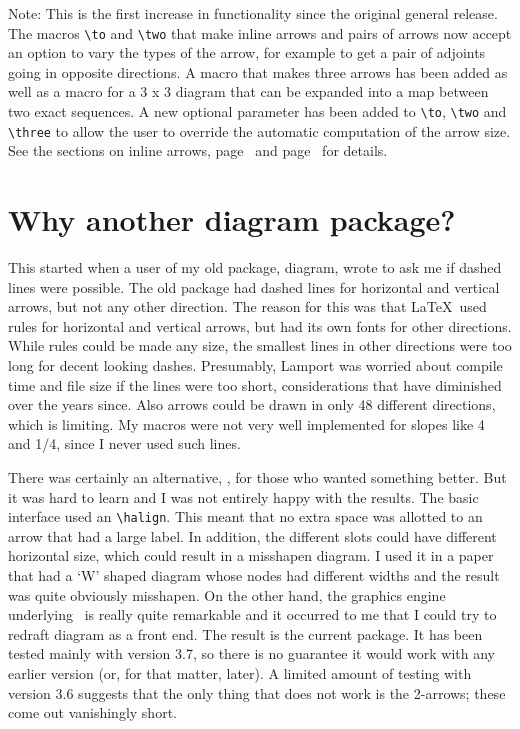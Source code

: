 \documentclass[12pt]{article}
\begin{document}
\kern 5pt
 Note:  This is the first increase in functionality since the original
general release.  The macros \verb.\to. and
\verb.\two. that make inline arrows and pairs of arrows now
accept an option to vary the types of the arrow, for example to get a
pair of adjoints going in opposite directions.  A macro that makes three
arrows has been added as well as a macro for a 3 x 3 diagram that can be
expanded into a map between two exact sequences.  A new optional
parameter has been added to \verb.\to.,
\verb.\two. and \verb.\three. to allow the
user to override the automatic computation of the arrow size.  See the
sections on inline arrows, page~\pageref{added} and
page~\pageref{complex} for details.

\section{Why another diagram package?}

This started when a user of my old package, diagram, wrote to ask me if
dashed lines were possible.  The old package had dashed lines for
horizontal and vertical arrows, but not any other direction.  The reason
for this was that \LaTeX\ used rules for horizontal and vertical arrows,
but had its own fonts for other directions.  While rules could be made
any size, the smallest lines in other directions were too long for
decent looking dashes.  Presumably, Lamport was worried about compile
time and file size if the lines were too short, considerations that have
diminished over the years since.  Also arrows could be drawn in only 48
different directions, which is limiting.  My macros were not very well
implemented for slopes like 4 and 1/4, since I never used such lines.

There was certainly an alternative, \xypic, for those who wanted
something better.  But it was hard to learn and I was not entirely happy
with the results.  The basic interface used an
\verb.\halign..  This
meant that no extra space was allotted to an arrow that had a large
label.  In addition, the different slots could have different horizontal
size, which could result in a misshapen diagram.  I used it in a paper
that had a `W' shaped diagram whose nodes had different widths and the
result was quite obviously misshapen.  On the other hand, the graphics
engine underlying \xypic\ is really quite remarkable and it occurred to
me that I could try to redraft diagram as a front end.  The result is
the current package.  It has been tested mainly with version 3.7, so
there is no guarantee it would work with any earlier version (or, for
that matter, later).  A limited amount of testing with version 3.6
suggests that the only thing that does not work is the 2-arrows; these
come out vanishingly short.
\end{document}
